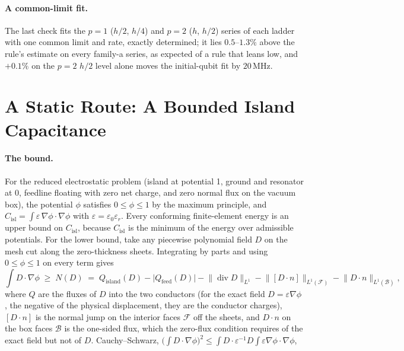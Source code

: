 \documentclass{anvil-paper}
\newcommand{\Cisl}{C_{\mathrm{isl}}}
\begin{document}
\paragraph{A common-limit fit.}
The last check fits the $p = 1$ ($h/2$, $h/4$) and $p = 2$ ($h$, $h/2$)
series of each ladder with one common limit and rate, exactly determined; it lies
$0.5$--$1.3\%$ above the rule's estimate on every family-a series, as
expected of a rule that leans low, and $+0.1\%$ on the $p = 2$ $h/2$ level
alone moves the initial-qubit fit by $20$\,MHz.

\section{A Static Route: A Bounded Island Capacitance}
\label{sec:static}

\paragraph{The bound.}
For the reduced electrostatic problem (island at potential 1, ground and
resonator at 0, feedline floating with zero net charge, and zero normal
flux on the vacuum box), the potential
$\phi$ satisfies $0 \le \phi \le 1$ by the maximum principle, and
$\Cisl = \int \varepsilon\,\nabla\phi\cdot\nabla\phi$ with $\varepsilon
= \varepsilon_0\varepsilon_r$. Every conforming finite-element energy is an
upper bound on $\Cisl$, because $\Cisl$ is the minimum of the energy
over admissible potentials. For the lower bound, take any piecewise
polynomial field $D$ on the mesh cut along the zero-thickness sheets.
Integrating by parts and using $0\le\phi\le1$ on every term gives
\begin{equation}
  \int D\cdot\nabla\phi \;\ge\; N(D) \;=\; Q_{\mathrm{island}}(D)
  - \lvert Q_{\mathrm{feed}}(D)\rvert
  - \lVert \operatorname{div} D\rVert_{L^1}
  - \lVert [D\cdot n]\rVert_{L^1(\mathcal F)}
  - \lVert D\cdot n\rVert_{L^1(\mathcal B)},
  \label{eq:cert-n}
\end{equation}
where $Q$ are the fluxes of $D$ into the two conductors (for the exact
field $D = \varepsilon\nabla\phi$, the negative of the physical
displacement, they are the conductor charges),
$[D\cdot n]$ is the normal jump on the interior faces $\mathcal F$ off
the sheets, and $D\cdot n$ on the box faces $\mathcal B$ is the one-sided
flux, which the zero-flux condition requires of the exact field but not
of $D$. Cauchy--Schwarz, $\bigl(\int D\cdot\nabla\phi\bigr)^2 \le
\int D\cdot\varepsilon^{-1}D \int\varepsilon\nabla\phi\cdot\nabla\phi$,
\end{document}
